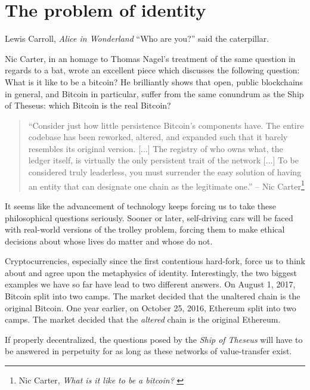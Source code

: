 \chapter{The problem of identity}
\label{les:4}

\begin{chapquote}{Lewis Carroll, \textit{Alice in Wonderland}}
  ``Who are you?'' said the caterpillar.
\end{chapquote}

Nic Carter, in an homage to Thomas Nagel's treatment of the same
question in regards to a bat, wrote an excellent piece which discusses
the following question: What is it like to be a bitcoin? He
brilliantly shows that open, public blockchains in general, and Bitcoin
in particular, suffer from the same conundrum as the Ship of
Theseus: which Bitcoin is the real Bitcoin?

\begin{quotation}
``Consider just how little persistence Bitcoin's components have. The
entire codebase has been reworked, altered, and expanded such that it
barely resembles its original version. [...] The registry of who
owns what, the ledger itself, is virtually the only persistent trait
of the network [...]
To be considered truly leaderless, you must surrender the easy
solution of having an entity that can designate one chain as the
legitimate one.''
\flushright -- Nic Carter\footnote{Nic Carter, \textit{What is it like to be a bitcoin?} \cite{bitcoin-identity}}
\end{quotation}

It seems like the advancement of technology keeps forcing us to take
these philosophical questions seriously. Sooner or later, self-driving
cars will be faced with real-world versions of the trolley problem,
forcing them to make ethical decisions about whose lives do matter and
whose do not.

Cryptocurrencies, especially since the first contentious hard-fork,
force us to think about and agree upon the metaphysics of identity.
Interestingly, the two biggest examples we have so far have lead to two
different answers. On August 1, 2017, Bitcoin split into two camps. The
market decided that the unaltered chain is the original Bitcoin. One
year earlier, on October 25, 2016, Ethereum split into two camps. The
market decided that the \textit{altered} chain is the original Ethereum.

If properly decentralized, the questions posed by the \textit{Ship of Theseus}
will have to be answered in perpetuity for as long as these networks of
value-transfer exist.

